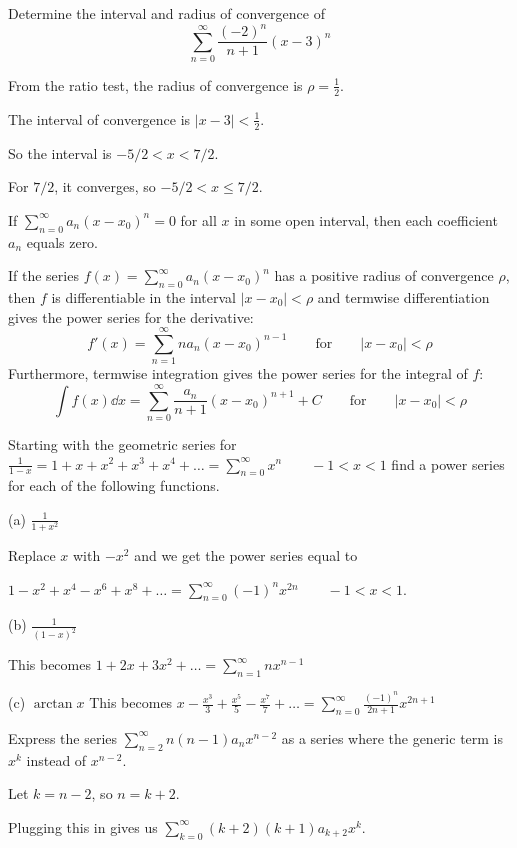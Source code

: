 \documentclass[../diffeq.tex]{subfiles}
\begin{document}
\begin{example}
    Determine the interval and radius of convergence of 
    \[ \sum_{n=0}^{\infty}\frac{(-2)^n}{n+1}(x-3)^n \]

    From the ratio test, the radius of convergence is $\rho=\frac{1}{2}$.

    The interval of convergence is $|x-3|<\frac{1}{2}$.

    So the interval is $-5/2<x<7/2$.

    For $7/2$, it converges, so $-5/2<x\leq 7/2$.
\end{example}

\begin{theorem}
    If $\sum_{n=0}^{\infty} a_n(x-x_0)^n=0$ for all $x$ in some open interval, then each coefficient $a_n$ equals zero.
\end{theorem}

\begin{theorem}
    If the series $f(x)=\sum_{n=0}^{\infty}a_n(x-x_0)^n$ has a positive radius of convergence $\rho$, then $f$ is differentiable in the interval $|x-x_0|<\rho$ and termwise 
    differentiation gives the power series for the derivative:
    \[ f'(x)=\sum_{n=1}^{\infty}na_n(x-x_0)^{n-1} \qquad \text{for} \qquad |x-x_0|<\rho \]
    Furthermore, termwise integration gives the power series for the integral of $f$:
    \[ \int f(x)\dd x = \sum^{\infty}_{n=0}\frac{a_n}{n+1} (x-x_0)^{n+1} + C \qquad \text{for} \qquad |x-x_0| < \rho \]
\end{theorem}

\begin{example}
    Starting with the geometric series for $\frac{1}{1-x}=1+x+x^2+x^3+x^4+\dots = \sum_{n=0}^{\infty}x^n \qquad -1<x<1$ find a power series for each of the following functions.

    (a) $\frac{1}{1+x^2}$

    Replace $x$ with $-x^2$ and we get the power series equal to 
    
    $1-x^2+x^4-x^6+x^8+\dots = \sum_{n=0}^{\infty}(-1)^n x^{2n} \qquad -1<x<1$.

    (b) $\frac{1}{(1-x)^2}$

    This becomes $1+2x+3x^2+\dots = \sum_{n=1}^{\infty}nx^{n-1}$

    (c) $\arctan x$
    This becomes $x-\frac{x^3}{3}+\frac{x^5}{5}-\frac{x^7}{7}+\dots = \sum_{n=0}^{\infty}\frac{(-1)^n}{2n+1}x^{2n+1}$
\end{example}

\begin{example}
    Express the series $\sum_{n=2}^{\infty}n(n-1)a_n x^{n-2}$ as a series where the generic term is $x^k$ instead of $x^{n-2}$.

    Let $k=n-2$, so $n=k+2$.

    Plugging this in gives us $\sum_{k=0}^{\infty}(k+2)(k+1)a_{k+2}x^k$.
\end{example}
\end{document}
